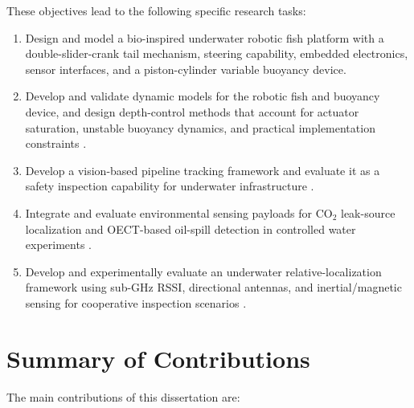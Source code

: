 \documentclass{uhcoethesis}
\begin{document}
These objectives lead to the following specific research tasks:

\begin{enumerate}
\item Design and model a bio-inspired underwater robotic fish platform with a double-slider-crank tail mechanism, steering capability, embedded electronics, sensor interfaces, and a piston-cylinder variable buoyancy device.
\item Develop and validate dynamic models for the robotic fish and buoyancy device, and design depth-control methods that account for actuator saturation, unstable buoyancy dynamics, and practical implementation constraints \cite{Masood2023,Masood2026ESCBCD}.
\item Develop a vision-based pipeline tracking framework and evaluate it as a safety inspection capability for underwater infrastructure \cite{Masood2025Pipeline}.
\item Integrate and evaluate environmental sensing payloads for \mbox{CO$_2$} leak-source localization and OECT-based oil-spill detection in controlled water experiments \cite{Masood2025CO2,Masood2026OilSpill}.
\item Develop and experimentally evaluate an underwater relative-localization framework using sub-GHz RSSI, directional antennas, and inertial/magnetic sensing for cooperative inspection scenarios \cite{Masood2026RSSI,Masood2025Swarm}.
\end{enumerate}

\section{Summary of Contributions}

The main contributions of this dissertation are:
\end{document}
